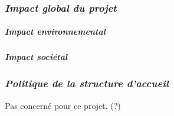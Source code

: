\documentclass[
]{article}
\begin{document}
\subsubsection{\texorpdfstring{\emph{Impact global du
projet}}{Impact global du projet}}\label{impact-global-du-projet}

\subparagraph{Impact environnemental}\label{impact-environnemental}

\subparagraph{Impact sociétal}\label{impact-sociuxe9tal}

\subsubsection{\texorpdfstring{\emph{Politique de la structure
d'accueil}}{Politique de la structure d'accueil}}\label{politique-de-la-structure-daccueil}

Pas concerné pour ce projet. (?)
\end{document}

